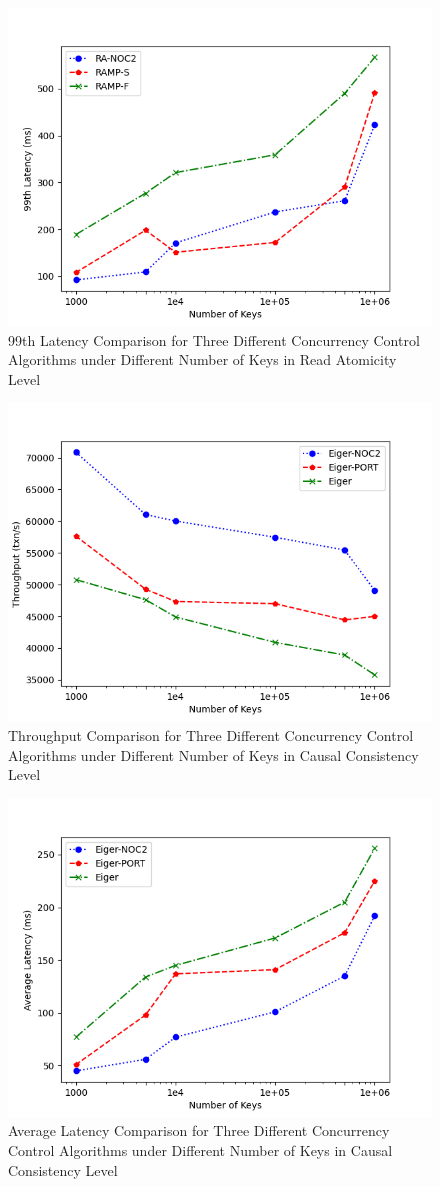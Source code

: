 \begin{figure}[H]
    \centering
    \includegraphics[width=0.8\linewidth]{figure/6-ra-l.png}
    \caption{99th Latency Comparison for Three Different Concurrency Control Algorithms under Different Number of Keys in Read Atomicity Level}
    \label{fig:27}
\end{figure}
\begin{figure}[H]
    \centering
    \includegraphics[width=0.8\linewidth]{figure/6-tcc-t.png}
    \caption{Throughput Comparison for Three Different Concurrency Control Algorithms under Different Number of Keys in Causal Consistency Level}
    \label{fig:28}
\end{figure}
\begin{figure}[H]
    \centering
    \includegraphics[width=0.8\linewidth]{figure/6-tcc-al.png}
    \caption{Average Latency Comparison for Three Different Concurrency Control Algorithms under Different Number of Keys in Causal Consistency Level}
    \label{fig:29}
\end{figure}
